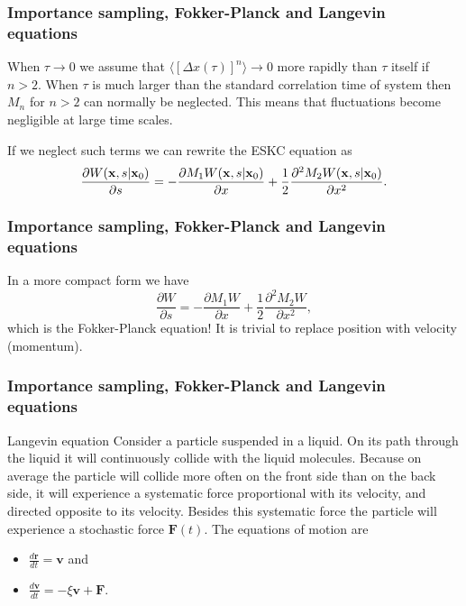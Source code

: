 \documentclass{beamer}
\begin{document}
\begin{frame}
\frametitle{Importance sampling, Fokker-Planck and Langevin equations}

\begin{block}{}
When $\tau \rightarrow 0$ we assume that $\langle [\Delta x(\tau)]^n\rangle \rightarrow 0$ more rapidly than $\tau$ itself if $n > 2$. 
When $\tau$ is much larger than the standard correlation time of 
system then $M_n$ for $n > 2$ can normally be neglected.
This means that fluctuations become negligible at large time scales.

If we neglect such terms we can rewrite the ESKC equation as 
\[
\frac{\partial W({\bf x},s|{\bf x}_0)}{\partial s}=
-\frac{\partial M_1W({\bf x},s|{\bf x}_0)}{\partial x}+
\frac{1}{2}\frac{\partial^2 M_2W({\bf x},s|{\bf x}_0)}{\partial x^2}.
\]
\end{block}
\end{frame}

\begin{frame}
\frametitle{Importance sampling, Fokker-Planck and Langevin equations}

\begin{block}{}
In a more compact form we have
\[
\frac{\partial W}{\partial s}=
-\frac{\partial M_1W}{\partial x}+
\frac{1}{2}\frac{\partial^2 M_2W}{\partial x^2},
\]
which is the Fokker-Planck equation!  It is trivial to replace 
position with velocity (momentum).
\end{block}
\end{frame}

\begin{frame}
\frametitle{Importance sampling, Fokker-Planck and Langevin equations}

\begin{block}{Langevin equation }
Consider a particle  suspended in a liquid. On its path through the liquid it will continuously collide with the liquid molecules. Because on average the particle  will collide more often on the front side than on the back side, it will experience a systematic force proportional with its velocity, and directed opposite to its velocity. Besides this systematic force the particle  will experience a stochastic force  $\mathbf{F}(t)$. 
The equations of motion are 
\begin{itemize}
\item $\frac{d\mathbf{r}}{dt}=\mathbf{v}$ and 

\item $\frac{d\mathbf{v}}{dt}=-\xi \mathbf{v}+\mathbf{F}$.
\end{itemize}

\noindent
\end{block}
\end{frame}
\end{document}

